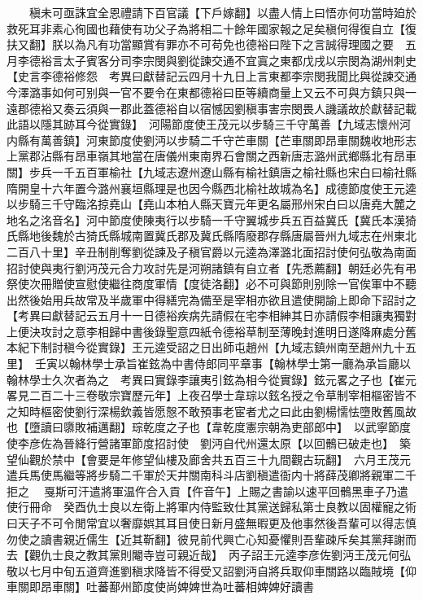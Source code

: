 　　稹未可亟誅宜全恩禮請下百官議【下戶嫁翻】以盡人情上曰悟亦何功當時廹於救死耳非素心徇國也藉使有功父子為將相二十餘年國家報之足矣稹何得復自立【復扶又翻】朕以為凡有功當顯賞有罪亦不可苟免也德裕曰陛下之言誠得理國之要　五月李德裕言太子賓客分司李宗閔與劉從諫交通不宜寘之東都戊戌以宗閔為湖州刺史【史言李德裕修怨　考異曰獻替記云四月十九日上言東都李宗閔我聞比與從諫交通今澤潞事如何可别與一官不要令在東都德裕曰臣等續商量上又云不可與方鎮只與一遠郡德裕又奏云須與一郡此蓋德裕自以宿憾因劉稹事害宗閔畏人譏議故於獻替記載此語以隱其跡耳今從實錄】　河陽節度使王茂元以步騎三千守萬善【九域志懷州河内縣有萬善鎮】河東節度使劉沔以步騎二千守芒車關【芒車關即昂車關魏收地形志上黨郡沾縣有昂車嶺其地當在唐儀州東南界石會關之西新唐志潞州武鄉縣北有昂車關】步兵一千五百軍榆社【九域志遼州遼山縣有榆社鎮唐之榆社縣也宋白曰榆社縣隋開皇十六年置今潞州襄垣縣理是也因今縣西北榆社故城為名】成德節度使王元逵以步騎三千守臨洺掠堯山【堯山本柏人縣天寶元年更名屬邢州宋白曰以唐堯大麓之地名之洺音名】河中節度使陳夷行以步騎一千守翼城步兵五百益冀氏【冀氏本漢猗氏縣地後魏於古猗氏縣城南置冀氏郡及冀氏縣隋廢郡存縣唐屬晉州九域志在州東北二百八十里】辛丑制削奪劉從諫及子稹官爵以元逵為澤潞北面招討使何弘敬為南面招討使與夷行劉沔茂元合力攻討先是河朔諸鎮有自立者【先悉薦翻】朝廷必先有弔祭使次冊贈使宣慰使繼往商度軍情【度徒洛翻】必不可與節則别除一官俟軍中不聽出然後始用兵故常及半歲軍中得繕完為備至是宰相亦欲且遣使開諭上即命下詔討之　【考異曰獻替記云五月十一日德裕疾病先請假在宅李相紳其日亦請假李相讓夷獨對上便決攻討之意李相歸中書後錄聖意四紙令德裕草制至薄晚封進明日遂降麻處分舊本紀下制討稹今從實錄】王元逵受詔之日出師屯趙州【九域志鎮州南至趙州九十五里】　壬寅以翰林學士承旨崔鉉為中書侍郎同平章事【翰林學士第一廳為承旨廳以翰林學士久次者為之　考異曰實錄李讓夷引鉉為相今從實錄】鉉元畧之子也【崔元畧見二百二十三卷敬宗寶歷元年】上夜召學士韋琮以鉉名授之令草制宰相樞密皆不之知時樞密使劉行深楊欽義皆愿慤不敢預事老宦者尤之曰此由劉楊懦怯墮敗舊風故也【墮讀曰隳敗補邁翻】琮乾度之子也【韋乾度憲宗朝為吏部郎中】　以武寧節度使李彦佐為晉絳行營諸軍節度招討使　劉沔自代州還太原【以回鶻已破走也】　築望仙觀於禁中【會要是年修望仙樓及廊舍共五百三十九間觀古玩翻】　六月王茂元遣兵馬使馬繼等將步騎二千軍於天井關南科斗店劉稹遣衙内十將薛茂卿將親軍二千拒之　戛斯可汗遣將軍温仵合入貢【仵音午】上賜之書諭以速平回鶻黑車子乃遣使行冊命　癸酉仇士良以左衛上將軍内侍監致仕其黨送歸私第士良教以固權寵之術曰天子不可令閒常宜以奢靡娯其耳目使日新月盛無暇更及他事然後吾輩可以得志慎勿使之讀書親近儒生【近其靳翻】彼見前代興亡心知憂懼則吾輩疎斥矣其黨拜謝而去【觀仇士良之教其黨則閹寺豈可親近哉】　丙子詔王元逵李彦佐劉沔王茂元何弘敬以七月中旬五道齊進劉稹求降皆不得受又詔劉沔自將兵取仰車關路以臨賊境【仰車關即昂車關】吐蕃鄯州節度使尚婢婢世為吐蕃相婢婢好讀書

